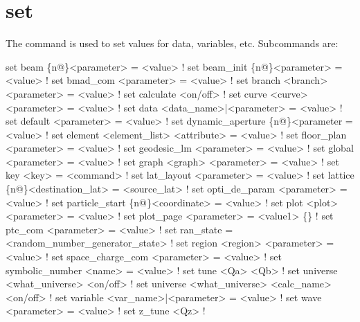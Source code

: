 {{\section{set}
\label{s:set}

The  command is used to set values for data, variables, etc. Subcommands are:
\begin{example}
  set beam \{n@\}<parameter> = <value>                        ! 
  set beam_init \{n@\}<parameter> = <value>                   ! 
  set bmad_com <parameter> = <value>                        ! 
  set branch <branch> <parameter> = <value>                 ! 
  set calculate <on/off>                                    ! 
  set curve <curve> <parameter> = <value>                   ! 
  set data <data_name>|<parameter> = <value>                ! 
  set default <parameter> = <value>                         ! 
  set dynamic_aperture \{n@\}<parameter = <value>             ! 
  set element <element_list> <attribute> = <value>          ! 
  set floor_plan <parameter> = <value>                      ! 
  set geodesic_lm <parameter> = <value>                     ! 
  set global <parameter> = <value>                          ! 
  set graph <graph> <parameter> = <value>                   ! 
  set key <key> = <command>                                 ! 
  set lat_layout <parameter> = <value>                      ! 
  set lattice \{n@\}<destination_lat> = <source_lat>          ! 
  set opti_de_param <parameter> = <value>                   ! 
  set particle_start \{n@\}<coordinate> = <value>             ! 
  set plot <plot> <parameter> = <value>                     ! 
  set plot_page <parameter> = <value1> \{<value2>\}           ! 
  set ptc_com <parameter> = <value>                         ! 
  set ran_state = <random_number_generator_state>           ! 
  set region <region> <parameter> = <value>                 ! 
  set space_charge_com <parameter> = <value>                ! 
  set symbolic_number <name> = <value>                      ! 
  set tune <Qa> <Qb>                                        ! 
  set universe <what_universe> <on/off>                     ! 
  set universe <what_universe> <calc_name> <on/off>         ! 
  set variable <var_name>|<parameter> = <value>             ! 
  set wave <parameter> = <value>                            ! 
  set z_tune <Qz>                                           ! 
\end{example}

}}
